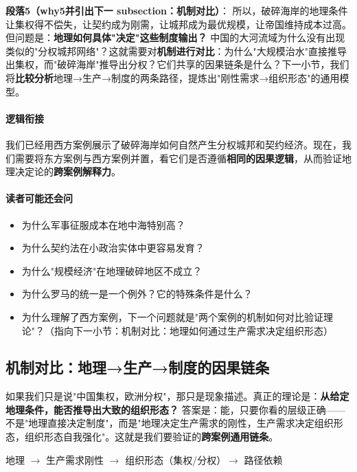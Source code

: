 \documentclass[../main.tex]{subfiles}
\begin{document}
	\textbf{段落5（why5并引出下一 subsection：机制对比）}：  
	所以，破碎海岸的地理条件让集权得不偿失，让契约成为刚需，让城邦成为最优规模，让帝国维持成本过高。但问题是：\textbf{地理如何具体"决定"这些制度输出？} 中国的大河流域为什么没有出现类似的"分权城邦网络"？这就需要对\textbf{机制进行对比}：为什么"大规模治水"直接推导出集权，而"破碎海岸"推导出分权？它们共享的因果链条是什么？下一小节，我们将\textbf{比较分析}地理→生产→制度的两条路径，提炼出"刚性需求→组织形态"的通用模型。
	
	\paragraph*{逻辑衔接}
	我们已经用西方案例展示了破碎海岸如何自然产生分权城邦和契约经济。现在，我们需要将东方案例与西方案例并置，看它们是否遵循\textbf{相同的因果逻辑}，从而验证地理决定论的\textbf{跨案例解释力}。
	
	\paragraph*{读者可能还会问}
	\begin{itemize}
\item 为什么军事征服成本在地中海特别高？
	\item 为什么契约法在小政治实体中更容易发育？
	\item 为什么"规模经济"在地理破碎地区不成立？
	\item 为什么罗马的统一是一个例外？它的特殊条件是什么？
	\item 为什么理解了西方案例，下一个问题就是"两个案例的机制如何对比验证理论"？（指向下一小节：机制对比：地理如何通过生产需求决定组织形态）
\end{itemize}
	
	\subsection{机制对比：地理→生产→制度的因果链条}
	
	\begin{motivation}
		如果我们只是说"中国集权，欧洲分权"，那只是现象描述。真正的理论是：\textbf{从给定地理条件，能否推导出大致的组织形态？} 答案是：能，只要你看的层级正确——不是"地理直接决定制度"，而是"地理决定生产需求的刚性，生产需求决定组织形态，组织形态自我强化"。这就是我们要验证的\textbf{跨案例通用链条}。
	\end{motivation}
	
	\begin{logicmap}
		地理 $\rightarrow$ 生产需求刚性 $\rightarrow$ 组织形态（集权/分权）$\rightarrow$ 路径依赖
	\end{logicmap}
	
\end{document}
